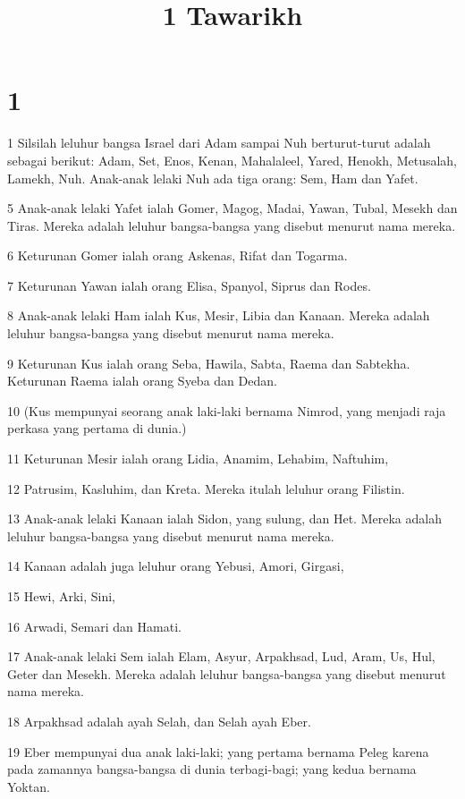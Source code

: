 

\title{1 Tawarikh}


\chapter{1}

\par 1 Silsilah leluhur bangsa Israel dari Adam sampai Nuh berturut-turut adalah sebagai berikut: Adam, Set, Enos, Kenan, Mahalaleel, Yared, Henokh, Metusalah, Lamekh, Nuh. Anak-anak lelaki Nuh ada tiga orang: Sem, Ham dan Yafet.
\par 5 Anak-anak lelaki Yafet ialah Gomer, Magog, Madai, Yawan, Tubal, Mesekh dan Tiras. Mereka adalah leluhur bangsa-bangsa yang disebut menurut nama mereka.
\par 6 Keturunan Gomer ialah orang Askenas, Rifat dan Togarma.
\par 7 Keturunan Yawan ialah orang Elisa, Spanyol, Siprus dan Rodes.
\par 8 Anak-anak lelaki Ham ialah Kus, Mesir, Libia dan Kanaan. Mereka adalah leluhur bangsa-bangsa yang disebut menurut nama mereka.
\par 9 Keturunan Kus ialah orang Seba, Hawila, Sabta, Raema dan Sabtekha. Keturunan Raema ialah orang Syeba dan Dedan.
\par 10 (Kus mempunyai seorang anak laki-laki bernama Nimrod, yang menjadi raja perkasa yang pertama di dunia.)
\par 11 Keturunan Mesir ialah orang Lidia, Anamim, Lehabim, Naftuhim,
\par 12 Patrusim, Kasluhim, dan Kreta. Mereka itulah leluhur orang Filistin.
\par 13 Anak-anak lelaki Kanaan ialah Sidon, yang sulung, dan Het. Mereka adalah leluhur bangsa-bangsa yang disebut menurut nama mereka.
\par 14 Kanaan adalah juga leluhur orang Yebusi, Amori, Girgasi,
\par 15 Hewi, Arki, Sini,
\par 16 Arwadi, Semari dan Hamati.
\par 17 Anak-anak lelaki Sem ialah Elam, Asyur, Arpakhsad, Lud, Aram, Us, Hul, Geter dan Mesekh. Mereka adalah leluhur bangsa-bangsa yang disebut menurut nama mereka.
\par 18 Arpakhsad adalah ayah Selah, dan Selah ayah Eber.
\par 19 Eber mempunyai dua anak laki-laki; yang pertama bernama Peleg karena pada zamannya bangsa-bangsa di dunia terbagi-bagi; yang kedua bernama Yoktan.
